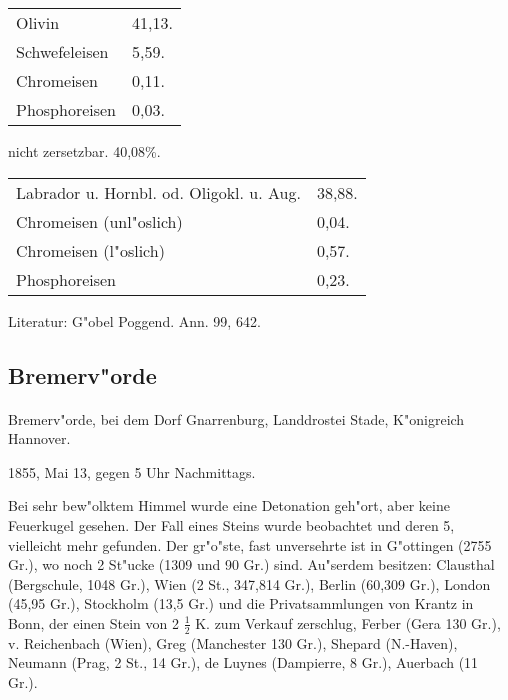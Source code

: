 \documentclass[a4paper, 11pt, oneside]{article}
\begin{document}
\begin{table}[H]
    \centering
    \begin{tabular}{l l}
        \hline
        Olivin & 41,13. \\
        Schwefeleisen & 5,59. \\
        Chromeisen & 0,11. \\
        Phosphoreisen & 0,03. \\
    \end{tabular}
\end{table}

\begin{center}
nicht zersetzbar. 40,08\%.
\end{center}

\begin{table}[H]
    \centering
    \begin{tabular}{l l}
        \hline
        Labrador u. Hornbl. od. Oligokl. u. Aug.  & 38,88. \\
        Chromeisen (unl"oslich) & 0,04. \\
        Chromeisen (l"oslich) & 0,57. \\
        Phosphoreisen & 0,23. \\
    \end{tabular}
\end{table}

\footnotesize
Literatur: G"obel Poggend. Ann. 99, 642.

\subsection{Bremerv"orde}
\normalsize
\paragraph{}
Bremerv"orde, bei dem Dorf Gnarrenburg, Landdrostei Stade, K"onigreich Hannover.

1855, Mai 13, gegen 5 Uhr Nachmittags.

Bei sehr bew"olktem Himmel wurde eine Detonation geh"ort, aber keine Feuerkugel gesehen. Der Fall eines Steins wurde beobachtet und deren 5, vielleicht mehr gefunden. Der gr"o"ste, fast unversehrte ist in G"ottingen (2755 Gr.), wo noch 2 St"ucke (1309 und 90 Gr.) sind. Au"serdem besitzen: Clausthal (Bergschule, 1048 Gr.), Wien (2 St., 347,814 Gr.), Berlin (60,309 Gr.), London (45,95 Gr.), Stockholm (13,5 Gr.) und die Privatsammlungen von Krantz in Bonn, der einen Stein von 2 $\frac{1}{2}$ K. zum Verkauf zerschlug, Ferber (Gera 130 Gr.), v. Reichenbach (Wien), Greg (Manchester 130 Gr.), Shepard (N.-Haven), Neumann (Prag, 2 St., 14 Gr.), de Luynes (Dampierre, 8 Gr.), Auerbach (11 Gr.).
\end{document}
